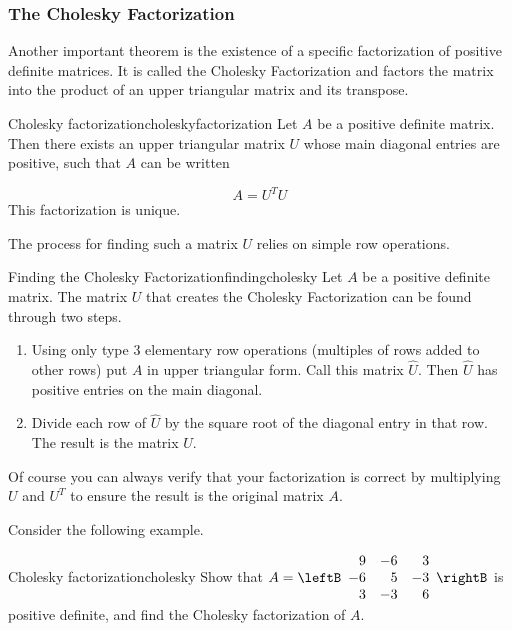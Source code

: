 \subsubsection{The Cholesky Factorization}

Another important theorem is the existence of a specific factorization of positive definite matrices. It is called the Cholesky Factorization and factors the matrix into the product of an upper triangular matrix and its transpose.

\begin{theorem}{Cholesky factorization}{choleskyfactorization}
Let $A$ be a positive definite matrix. Then
there exists an upper triangular matrix $U$ whose main diagonal entries are positive, such that $A$ can be written

\begin{equation*}
A=
U^TU
\end{equation*}
This factorization is unique.
\end{theorem}

The process for finding such a matrix $U$ relies on simple row operations.

\begin{procedure}{Finding the Cholesky Factorization}{findingcholesky}
Let $A$ be a positive definite matrix. The matrix $U$ that creates the Cholesky Factorization can be found through two steps.
\begin{enumerate}
\item Using only type $3$ elementary row operations (multiples of rows added to other rows) put $A$ in upper triangular form. Call this matrix $\hat{U}$. Then $\hat{U}$ has positive entries on the main diagonal. 
\item Divide each row of $\hat{U}$ by the square root of the diagonal entry in that row. The result is the matrix $U$. 
\end{enumerate}
\end{procedure}

Of course you can always verify that your factorization is correct by multiplying $U$ and $U^T$ to ensure the result is the original matrix $A$. 

Consider the following example.

\begin{example}{Cholesky factorization}{cholesky}
Show that
$A=\leftB\begin{array}{rrr}
9 & -6 & 3 \\ -6 & 5 & -3 \\ 3 & -3 & 6 
\end{array}\rightB$ 
is positive definite, and find the Cholesky factorization of $A$.
\end{example}

